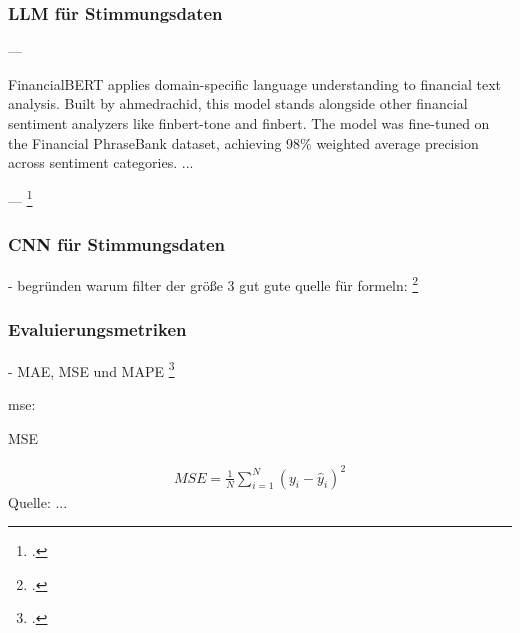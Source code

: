 \subsubsection{LLM für Stimmungsdaten}\label{sec:theorie_llm}
---

FinancialBERT applies domain-specific language understanding to financial text analysis. Built by ahmedrachid, this model stands alongside other financial sentiment analyzers like finbert-tone and finbert. The model was fine-tuned on the Financial PhraseBank dataset, achieving 98\% weighted average precision across sentiment categories.
...

---
\footcite{hazourli2022financialbert}


\subsubsection{CNN für Stimmungsdaten}\label{sec:theorie_cnn}

- begründen warum filter der größe 3 gut
gute quelle für formeln: \footcite{guan2020stockprice}

\subsubsection{Evaluierungsmetriken}\label{sec:theorie_evalmetrics}

- \ac{MAE}, \ac{MSE} und \ac{MAPE}  
\footcite[Kap. 4.3]{xie2024deep}

mse:

\begin{formel}[h]
	\caption{\ac{MSE}}
	\label{frm:mse}
	\begin{align}
		MSE = \frac{1}{N} \sum_{i=1}^{N} (y_i - \hat{y}_i)^2
	\end{align}
	\vspace{0.5em}
	\normalsize{Quelle: ...}
	\vspace{-1.0em}
\end{formel}







